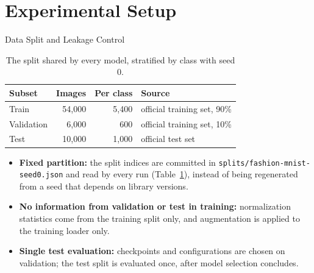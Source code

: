 
\section{Experimental Setup}

\begin{frame}{Data Split and Leakage Control}
\begin{table}
\centering
\caption{The split shared by every model, stratified by class with seed 0.}
\label{tab:split}
\begin{tabular}{lrrl}
\toprule
\textbf{Subset} & \textbf{Images} & \textbf{Per class} & \textbf{Source} \\
\midrule
Train      & 54{,}000 & 5{,}400 & official training set, 90\% \\
Validation &  6{,}000 &    600  & official training set, 10\% \\
Test       & 10{,}000 & 1{,}000 & official test set \\
\bottomrule
\end{tabular}
\end{table}

\small
\begin{itemize}
    \item \textbf{Fixed partition:} the split indices are committed in \texttt{splits/fashion-mnist-seed0.json} and
          read by every run (Table~\ref{tab:split}), instead of being regenerated from a seed that depends on library versions.
    \item \textbf{No information from validation or test in training:} normalization statistics come from the training
          split only, and augmentation is applied to the training loader only.
    \item \textbf{Single test evaluation:} checkpoints and configurations are chosen on validation; the test split is
          evaluated once, after model selection concludes.
\end{itemize}
\end{frame}

